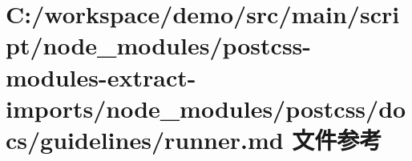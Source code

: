 \hypertarget{postcss-modules-extract-imports_2node__modules_2postcss_2docs_2guidelines_2runner_8md}{}\section{C\+:/workspace/demo/src/main/script/node\+\_\+modules/postcss-\/modules-\/extract-\/imports/node\+\_\+modules/postcss/docs/guidelines/runner.md 文件参考}
\label{postcss-modules-extract-imports_2node__modules_2postcss_2docs_2guidelines_2runner_8md}

